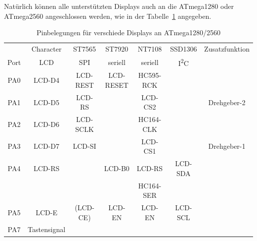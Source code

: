 Natürlich können alle unterstützten Displays auch an die ATmega1280 oder ATmega2560 angeschlossen
werden, wie in der Tabelle~\ref{tab:display-1280} angegeben.

\begin{table}[H]
  \begin{center}
    \begin{tabular}{| c || c | c | c | c | c | c |}
    \hline
           & Character     &  ST7565     & ST7920       & NT7108       & SSD1306     & Zusatzfunktion \\
      Port & LCD           &    SPI      & seriell      & seriell      &    I\textsuperscript{2}C      & \\
    \hline
    \hline
    PA0    &  LCD-D4       &   LCD-REST  &  LCD-RESET   & HC595-RCK       &             & \\
    \hline
    PA1    &  LCD-D5       &   LCD-RS    &              & LCD-CS2        &             & Drehgeber-2 \\
    \hline
    PA2    &  LCD-D6       &   LCD-SCLK  &              & HC164-CLK      &             & \\
    \hline
    PA3    &  LCD-D7       &   LCD-SI    &              & LCD-CS1        &             & Drehgeber-1 \\
    \hline
    PA4    &  LCD-RS       &             &   LCD-B0     & LCD-RS         &   LCD-SDA   & \\
           &               &             &              & HC164-SER      &             & \\
    \hline
    PA5    &  LCD-E        &  (LCD-CE)   &   LCD-EN     & LCD-EN         &   LCD-SCL  & \\
    \hline
    PA7    &  Tastensignal &             &              &                &             & \\
    \hline
    \end{tabular}
  \end{center}
  \caption{Pinbelegungen für verschiede Displays an ATmega1280/2560}
  \label{tab:display-1280}
\end{table}

